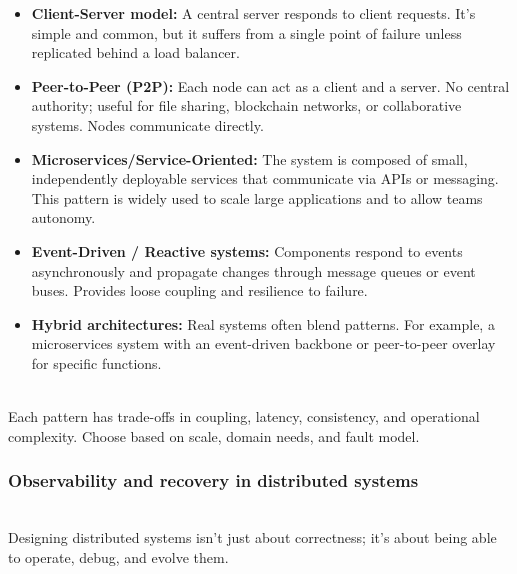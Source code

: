\begin{itemize}
\item
\protect{}\label{HKvFujIXRPZX4epUIZpS8}
\textbf{Client-Server model:} A central server responds to client requests. It's simple and common, but it suffers from a single point of failure unless replicated behind a load balancer.
\item
\protect{}\label{NXeqXvuBwIJpzSxcSusq8}
\textbf{Peer-to-Peer (P2P):} Each node can act as a client and a server. No central authority; useful for file sharing, blockchain networks, or collaborative systems. Nodes communicate directly.
\item
\protect{}\label{LrhipnmLWctyCsC-R3wyH}
\textbf{Microservices/Service-Oriented:} The system is composed of small, independently deployable services that communicate via APIs or messaging. This pattern is widely used to scale large applications and to allow teams autonomy.
\item
\protect{}\label{XD19rFhZ54wWzWo4Vnzos}
\textbf{Event-Driven / Reactive systems:} Components respond to events asynchronously and propagate changes through message queues or event buses. Provides loose coupling and resilience to failure.
\item
\protect{}\label{Ud4AFwTymh8Hu0WvZTnmz}
\textbf{Hybrid architectures:} Real systems often blend patterns. For example, a microservices system with an event-driven backbone or peer-to-peer overlay for specific functions.
\end{itemize}
\\
Each pattern has trade-offs in coupling, latency, consistency, and operational complexity. Choose based on scale, domain needs, and fault model.

\subsubsection{Observability and recovery in distributed systems}\label{pMm4YBVcBZooBD6f0dD2x}
\\
Designing distributed systems isn't just about correctness; it's about being able to operate, debug, and evolve them.

